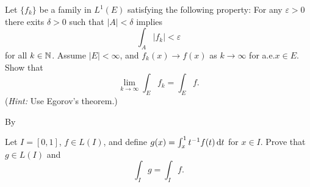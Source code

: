 \begin{problem}
  Let \(\{f_k\}\) be a family in \(L^1(E)\) satisfying the following
  property: For any \(\varepsilon>0\) there exits \(\delta>0\) such that
  \(|A|<\delta\) implies
  \[
    \int_A |f_k|<\varepsilon
  \]
  for all \(k\in\mathbb{N}\). Assume \(|E|<\infty\), and \(f_k(x)\to f(x)\) as
  \(k\to\infty\) for a.e.\@ \(x\in E\). Show that
  \[
    \lim_{k\to\infty}\int_E f_k=\int_E f.
  \]
  (\emph{Hint:} Use Egorov's theorem.)
\end{problem}
\begin{solution}
  By
\end{solution}

\begin{problem}
  Let \(I=[0,1]\), \(f\in L(I)\), and define
  \(g(x)=\int_x^1 t^{-1}f(t) \mathop{}\!\mathrm{d} t\) for \(x\in I\). Prove that
  \(g\in L(I)\) and
  \[
    \int_I g=\int_I f.
  \]
\end{problem}
\begin{solution}
\end{solution}

